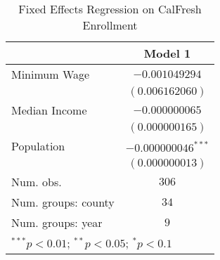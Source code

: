 
\begin{table}
\begin{center}
\begin{tabular}{l c}
\hline
 & Model 1 \\
\hline
Minimum Wage        & $-0.001049294$       \\
                    & $(0.006162060)$      \\
Median Income       & $-0.000000065$       \\
                    & $(0.000000165)$      \\
Population          & $-0.000000046^{***}$ \\
                    & $(0.000000013)$      \\
\hline
Num. obs.           & $306$                \\
Num. groups: county & $34$                 \\
Num. groups: year   & $9$                  \\
\hline
\multicolumn{2}{l}{\scriptsize{$^{***}p<0.01$; $^{**}p<0.05$; $^{*}p<0.1$}}
\end{tabular}
\caption{Fixed Effects Regression on CalFresh Enrollment}
\label{tab:calfresh_fe}
\end{center}
\end{table}
